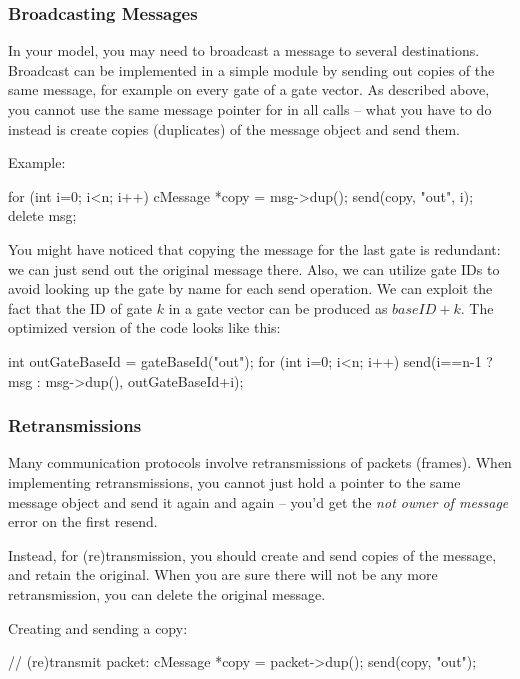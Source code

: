 \subsubsection{Broadcasting Messages}

In your model, you may need to broadcast a message to several destinations.
Broadcast can be implemented in a simple module by sending out copies
of the same message, for example on every gate of a gate vector.
As described above, you cannot use the same message pointer for
in all  calls -- what you have to do instead is
create copies (duplicates) of the message object and send them.

Example:

\begin{cpp}
for (int i=0; i<n; i++)
{
    cMessage *copy = msg->dup();
    send(copy, "out", i);
}
delete msg;
\end{cpp}

You might have noticed that copying the message for the last gate is
redundant: we can just send out the original message there.
Also, we can utilize gate IDs to avoid looking up the gate by name
for each send operation. We can exploit the fact that the ID of gate
$k$ in a gate vector can be produced as ${baseID} + k$.
The optimized version of the code looks like this:

\begin{cpp}
int outGateBaseId = gateBaseId("out");
for (int i=0; i<n; i++)
    send(i==n-1 ? msg : msg->dup(), outGateBaseId+i);
\end{cpp}


\subsubsection{Retransmissions}

Many communication protocols involve retransmissions of packets (frames).
When implementing retransmissions, you cannot just hold a pointer
to the same message object and send it again and again -- you'd get
the \textit{not owner of message} error on the first resend.

Instead, for (re)transmission, you should create and
send copies of the message, and retain the original.
When you are sure there will not be any more retransmission,
you can delete the original message.

Creating and sending a copy:

\begin{cpp}
// (re)transmit packet:
cMessage *copy = packet->dup();
send(copy, "out");
\end{cpp}

